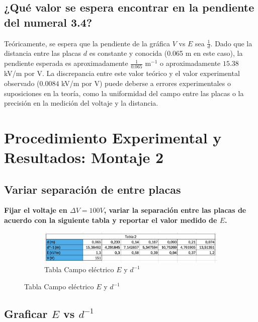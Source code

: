 \subsection{¿Qué valor se espera encontrar en la pendiente del numeral 3.4?}
Teóricamente, se espera que la pendiente de la gráfica $V$ vs $E$ sea $\frac{1}{d}$. Dado que la distancia entre las placas $d$ es constante y conocida (0.065 m en este caso), la pendiente esperada es aproximadamente $\frac{1}{0.065}$ m\(^{-1}\) o aproximadamente $15.38$ kV/m por V. La discrepancia entre este valor teórico y el valor experimental observado ($0.0084$ kV/m por V) puede deberse a errores experimentales o suposiciones en la teoría, como la uniformidad del campo entre las placas o la precisión en la medición del voltaje y la distancia.

\section{Procedimiento Experimental y Resultados: Montaje 2}

\subsection{Variar separación de entre placas}
\textbf{Fijar el voltaje en $\Delta V = 100V$, variar la separación entre las placas de acuerdo con
la siguiente tabla y reportar el valor medido de $E$.}
\begin{figure}[H]
    \centering
    \begin{subfigure}[b]{\textwidth}
        \centering
        \includegraphics[width=\textwidth]{Figures/1. Content/tablaCampoVSd1.png}
        \caption{Tabla Campo eléctrico $E$ y $d^{-1}$}
        \label{fig: tabla Campo vs d^-1}
    \end{subfigure}
    \hfill
\end{figure}

\subsection{Graficar $E$ vs $d^{-1}$}

